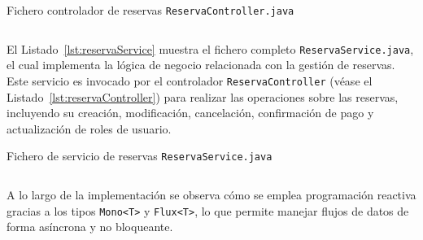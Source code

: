 \begin{longlisting}
    \caption{Fichero controlador de reservas {\tt ReservaController.java}}
    \inputminted[highlightlines={33,71,50,61,83}, firstline=26]{java}{../backend/elrincondeeva/elrincondeeva/src/main/java/es/uv/hemal/elrincondeeva/endpoints/ReservaController.java}
    \label{lst:reservaController}
\end{longlisting}


El Listado~\ref{lst:reservaService} muestra el fichero completo \texttt{ReservaService.java}, el cual implementa la lógica de negocio relacionada con la gestión de reservas. Este servicio es invocado por el controlador \texttt{ReservaController} (véase el Listado~\ref{lst:reservaController}) para realizar las operaciones sobre las reservas, incluyendo su creación, modificación, cancelación, confirmación de pago y actualización de roles de usuario.


\begin{longlisting} 
    \caption{Fichero de servicio de reservas {\tt ReservaService.java}} 
    \inputminted[firstline=25]{java}{../backend/elrincondeeva/elrincondeeva/src/main/java/es/uv/hemal/elrincondeeva/services/ReservaService.java} 
    \label{lst:reservaService} 
\end{longlisting}

A lo largo de la implementación se observa cómo se emplea programación reactiva gracias a los tipos \texttt{Mono<T>} y \texttt{Flux<T>}, lo que permite manejar flujos de datos de forma asíncrona y no bloqueante.

